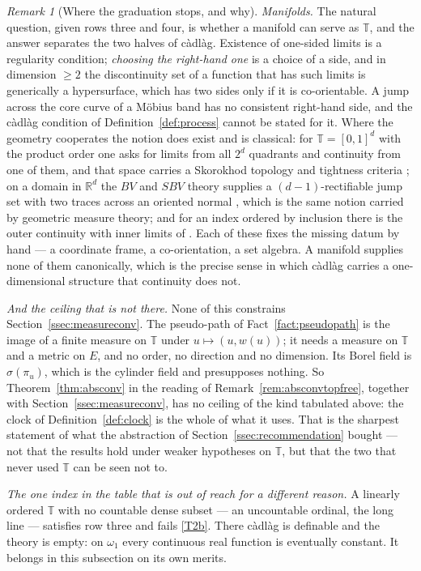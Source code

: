 \documentclass[11pt,a4paper]{article}
\theoremstyle{plain}
\theoremstyle{definition}
\theoremstyle{remark}
\newtheorem{remark}[theorem]{Remark}
\newcommand{\R}{\mathbb{R}}
\newcommand{\T}{\mathbb{T}}                     %
\begin{document}
\begin{remark}[Where the graduation stops, and why]
  \emph{Manifolds.}  The natural question, given rows three and four, is whether
  a manifold can serve as $\T$, and the answer separates the two halves of
  c\`adl\`ag.  Existence of one-sided limits is a regularity condition;
  \emph{choosing the right-hand one} is a choice of a side, and in dimension
  $\geq 2$ the discontinuity set of a function that has such limits is generically
  a hypersurface, which has two sides only if it is co-orientable.  A jump across
  the core curve of a M\"obius band has no consistent right-hand side, and
  the c\`adl\`ag condition of Definition~\ref{def:process} cannot be stated for it.  Where the geometry
  cooperates the notion does exist and is classical: for $\T = [0,1]^d$ with the
  product order one asks for limits from all $2^d$ quadrants and continuity from
  one of them, and that space carries a Skorokhod topology and tightness criteria
  \cite{Neu71,BW71,Str72,Whitt02}; on a domain in $\R^d$ the $BV$ and $SBV$ theory
  supplies a $(d-1)$-rectifiable jump set with two traces across an oriented
  normal \cite{AFP00}, which is the same notion carried by geometric measure
  theory; and for an index ordered by inclusion there is the outer continuity
  with inner limits of \cite{IM00}.  Each of these fixes the missing datum by
  hand --- a coordinate frame, a co-orientation, a set algebra.  A manifold
  supplies none of them canonically, which is the precise sense in which
  c\`adl\`ag carries a one-dimensional structure that continuity does not.

  \emph{And the ceiling that is not there.}  None of this constrains
  Section~\ref{ssec:measureconv}.  The pseudo-path of Fact~\ref{fact:pseudopath}
  is the image of a finite measure on $\T$ under $u \mapsto (u, w(u))$; it needs
  a measure on $\T$ and a metric on $E$, and no order, no direction and no
  dimension.  Its Borel field is $\sigma(\pi_u)$, which is the cylinder field and
  presupposes nothing.  So Theorem~\ref{thm:absconv} in the reading of
  Remark~\ref{rem:absconvtopfree}, together with
  Section~\ref{ssec:measureconv}, has no ceiling of the kind tabulated above:
  the clock of Definition~\ref{def:clock} is the whole of what it uses.  That is
  the sharpest statement of what the abstraction of Section~\ref{ssec:recommendation}
  bought --- not that the results hold under weaker hypotheses on $\T$, but that
  the two that never used $\T$ can be seen not to.

  \emph{The one index in the table that is out of reach for a different reason.}
  A linearly ordered $\T$ with no countable dense subset --- an uncountable
  ordinal, the long line --- satisfies row three and fails \eqref{T2b}.  There
  c\`adl\`ag is definable and the theory is empty: on $\omega_1$ every continuous
  real function is eventually constant.  It belongs in this subsection on its
  own merits.
\end{remark}
\end{document}
